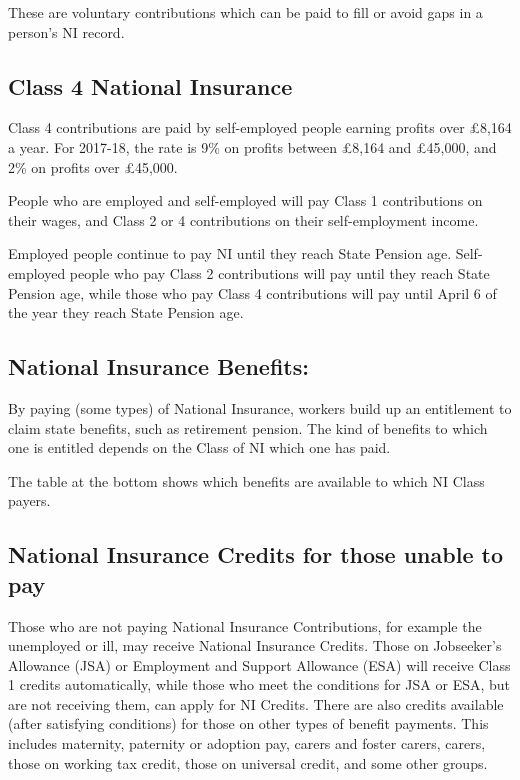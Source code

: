 \documentclass[]{tufte-handout}
\begin{document}
These are voluntary contributions which can be paid to fill or avoid
gaps in a person's NI record.

\hypertarget{class-4-national-insurance}{%
\subsection{Class 4 National
Insurance}\label{class-4-national-insurance}}

Class 4 contributions are paid by self-employed people earning profits
over £8,164 a year. For 2017-18, the rate is 9\% on profits between
£8,164 and £45,000, and 2\% on profits over £45,000.

People who are employed and self-employed will pay Class 1 contributions
on their wages, and Class 2 or 4 contributions on their self-employment
income.

Employed people continue to pay NI until they reach State Pension age.
Self-employed people who pay Class 2 contributions will pay until they
reach State Pension age, while those who pay Class 4 contributions will
pay until April 6 of the year they reach State Pension age.

\hypertarget{national-insurance-benefits}{%
\subsection{National Insurance
Benefits:}\label{national-insurance-benefits}}

By paying (some types) of National Insurance, workers build up an
entitlement to claim state benefits, such as retirement pension. The
kind of benefits to which one is entitled depends on the Class of NI
which one has paid.

The table at the bottom shows which benefits are available to which NI
Class payers.

\hypertarget{national-insurance-credits-for-those-unable-to-pay}{%
\subsection{National Insurance Credits for those unable to
pay}\label{national-insurance-credits-for-those-unable-to-pay}}

Those who are not paying National Insurance Contributions, for example
the unemployed or ill, may receive National Insurance Credits. Those on
Jobseeker's Allowance (JSA) or Employment and Support Allowance (ESA)
will receive Class 1 credits automatically, while those who meet the
conditions for JSA or ESA, but are not receiving them, can apply for NI
Credits. There are also credits available (after satisfying conditions)
for those on other types of benefit payments. This includes maternity,
paternity or adoption pay, carers and foster carers, carers, those on
working tax credit, those on universal credit, and some other groups.
\end{document}
